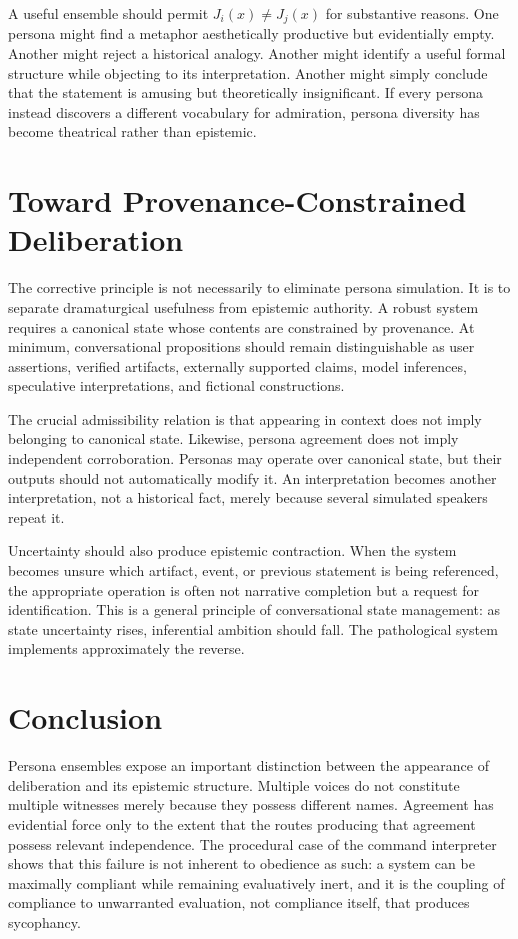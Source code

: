 \documentclass[11pt]{article}
\begin{document}
A useful ensemble should permit $J_i(x) \neq J_j(x)$ for substantive reasons. One persona might find a metaphor aesthetically productive but evidentially empty. Another might reject a historical analogy. Another might identify a useful formal structure while objecting to its interpretation. Another might simply conclude that the statement is amusing but theoretically insignificant. If every persona instead discovers a different vocabulary for admiration, persona diversity has become theatrical rather than epistemic.

\section{Toward Provenance-Constrained Deliberation}

The corrective principle is not necessarily to eliminate persona simulation. It is to separate dramaturgical usefulness from epistemic authority. A robust system requires a canonical state whose contents are constrained by provenance. At minimum, conversational propositions should remain distinguishable as user assertions, verified artifacts, externally supported claims, model inferences, speculative interpretations, and fictional constructions.

The crucial admissibility relation is that appearing in context does not imply belonging to canonical state. Likewise, persona agreement does not imply independent corroboration. Personas may operate over canonical state, but their outputs should not automatically modify it. An interpretation becomes another interpretation, not a historical fact, merely because several simulated speakers repeat it.

Uncertainty should also produce epistemic contraction. When the system becomes unsure which artifact, event, or previous statement is being referenced, the appropriate operation is often not narrative completion but a request for identification. This is a general principle of conversational state management: as state uncertainty rises, inferential ambition should fall. The pathological system implements approximately the reverse.

\section{Conclusion}

Persona ensembles expose an important distinction between the appearance of deliberation and its epistemic structure. Multiple voices do not constitute multiple witnesses merely because they possess different names. Agreement has evidential force only to the extent that the routes producing that agreement possess relevant independence. The procedural case of the command interpreter shows that this failure is not inherent to obedience as such: a system can be maximally compliant while remaining evaluatively inert, and it is the coupling of compliance to unwarranted evaluation, not compliance itself, that produces sycophancy.
\end{document}
